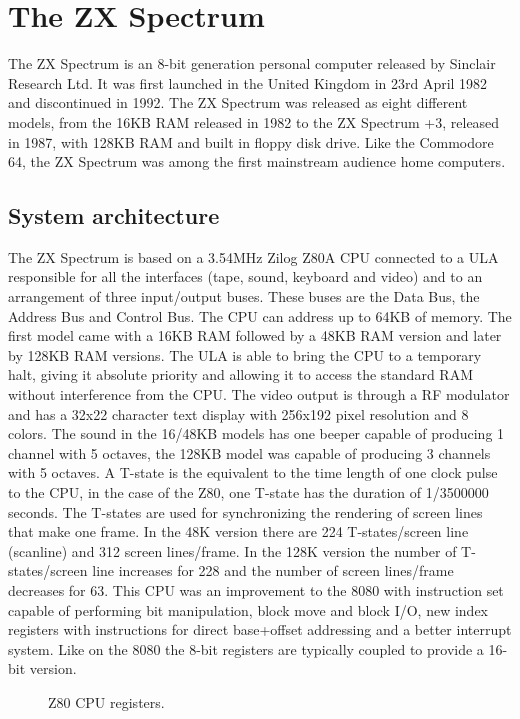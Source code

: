 \section{The ZX Spectrum}
The ZX Spectrum is an 8-bit generation personal computer released by Sinclair Research Ltd. It was first launched in the United Kingdom in 23rd April 1982 and discontinued in 1992. The ZX Spectrum was released as eight different models, from the 16KB RAM released in 1982 to the ZX Spectrum +3, released in 1987, with 128KB RAM and built in floppy disk drive. Like the Commodore 64, the ZX Spectrum was among the first mainstream audience home computers.

\subsection{System architecture}
The ZX Spectrum is based on a 3.54MHz Zilog Z80A CPU connected to a ULA responsible for all the interfaces (tape, sound, keyboard and video) and to an arrangement of three input/output buses. These buses are the Data Bus, the Address Bus and Control Bus. The CPU can address up to 64KB of memory. The first model came with a 16KB RAM followed by a 48KB RAM version and later by 128KB RAM versions. The ULA is able to bring the CPU to a temporary halt, giving it absolute priority and allowing it to access the standard RAM without interference from the CPU. The video output is through a RF modulator and has a 32x22 character text display with 256x192 pixel resolution and 8 colors. The sound in the 16/48KB models has one beeper capable of producing 1 channel with 5 octaves, the 128KB model was capable of producing 3 channels with 5 octaves.
A T-state is the equivalent to the time length of one clock pulse to the CPU, in the case of the Z80, one T-state has the duration of 1/3500000 seconds. The T-states are used for synchronizing the rendering of screen lines that make one frame. In the 48K version there are 224 T-states/screen line (scanline) and 312 screen lines/frame. In the 128K version the number of T-states/screen line increases for 228 and the number of screen lines/frame decreases for 63.
This CPU was an improvement to the 8080 with instruction set capable of performing bit manipulation, block move and block I/O, new index registers with instructions for direct base+offset addressing and a better interrupt system. Like on the 8080 the 8-bit registers are typically coupled to provide a 16-bit version.

\begin{figure}
	\caption{Z80 CPU registers.}
\end{figure}

